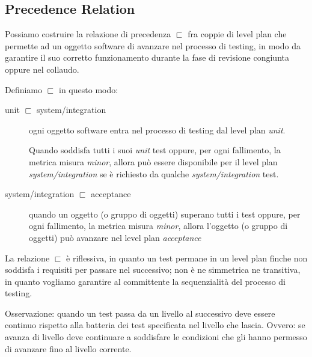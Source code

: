 \subsection{Precedence Relation}
Possiamo costruire la relazione di precedenza $\sqsubset$ fra coppie di level
plan che permette ad un oggetto software di avanzare nel processo di testing,
in modo da garantire il suo corretto funzionamento durante la fase di
revisione congiunta oppure nel collaudo. 

Definiamo $\sqsubset$ in questo modo: 
\begin{description}
  \item[unit $\sqsubset$ system/integration] ogni oggetto software entra nel 
processo di testing dal level plan \emph{unit}. 

Quando soddisfa tutti i suoi \emph{unit} test oppure, per ogni fallimento, la
metrica misura \emph{minor}, allora pu\`o essere disponibile per il level plan 
\emph{system/integration} se \`e richiesto da qualche \emph{system/integration}
test.
  \item[system/integration $\sqsubset$ acceptance] quando un oggetto (o gruppo
  di oggetti) superano tutti i test oppure, per ogni fallimento, la metrica 
  misura \emph{minor}, allora l'oggetto (o gruppo di oggetti) pu\`o avanzare
  nel level plan \emph{acceptance}
\end{description}
La relazione $\sqsubset$ \`e riflessiva, in quanto un test permane in un level
plan finche non soddisfa i requisiti per passare nel successivo; non \`e ne
simmetrica ne transitiva, in quanto vogliamo garantire al committente la
sequenzialit\`a del processo di testing.

Osservazione: quando un test passa da un livello al successivo deve essere
continuo rispetto alla batteria dei test specificata nel livello che lascia.
Ovvero: se avanza di livello deve continuare a soddisfare le condizioni che gli
hanno permesso di avanzare fino al livello corrente.



